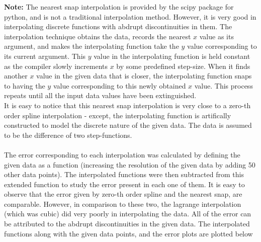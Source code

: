 \documentclass[12pt]{article}
\begin{document}
\textbf{Note:} The nearest snap interpolation is provided by the scipy package for python, and is not a traditional interpolation method. However, it is very good in interpolating discrete functions with abdrupt discontinuities in them. The interpolation technique obtains the data, records the nearest $x$ value as its argument, and makes the interpolating function take the $y$ value corresponding to its current argument. This $y$ value in the interpolating function is held constant as the compiler slowly increments $x$ by some predefined step-size. When it finds another $x$ value in the given data that is closer, the interpolating function snaps to having the $y$ value corresponding to this newly obtained $x$ value. This process repeats until all the input data values have been extinguished.  \\ \indent It is easy to notice that this nearest snap interpolation is very close to a zero-th order spline interpolation - except, the interpolating function is artifically constructed to model the discrete nature of the given data. The data is assumed to be the difference of two step-functions. \\\\


The error corresponding to each interpolation was calculated by defining the given data as a function (increasing the resolution of the given data by adding 50 other data points). The interpolated functions were then subtracted from this extended function to study the error present in each one of them. It is easy to observe that the error given by zero-th order spline and the nearest snap, are comparable. However, in comparison to these two, the lagrange interpolation (which was cubic) did very poorly in interpolating the data. All of the error can be attributed to the abdrupt discontinuities in the given data. The interpolated functions along with the given data points, and the error plots are plotted below \\
\end{document}
